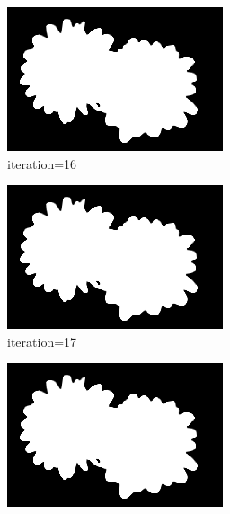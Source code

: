 \documentclass{article}
\begin{document}
\begin{figure}[t]
\begin{subfigure}[t]{0.19\textwidth}
\includegraphics[width=\textwidth]{./images/marginals_iter_16.png}
\vspace{-0.6cm}
\caption{iteration=16}
\end{subfigure}
\begin{subfigure}[t]{0.19\textwidth}
\centering
\includegraphics[width=\textwidth]{./images/marginals_iter_17.png}
\vspace{-0.6cm}
\caption{iteration=17}
\end{subfigure}
\begin{subfigure}[t]{0.19\textwidth}
\centering
\includegraphics[width=\textwidth]{./images/marginals_iter_18.png}

\end{subfigure}
\end{figure}
\end{document}
